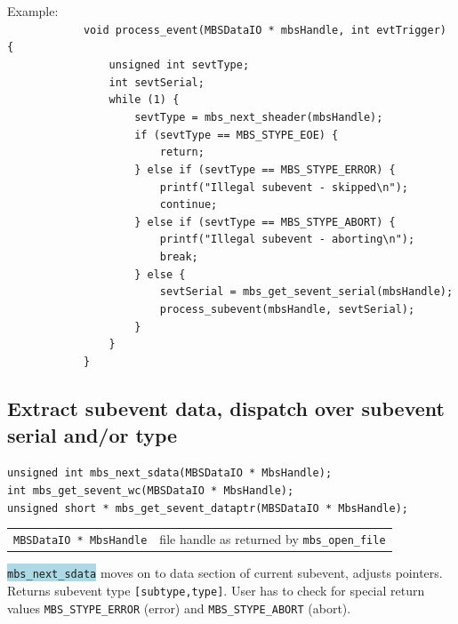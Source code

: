 \documentclass[10pt]{article}
\newcommand{\blue}[1]{\colorbox{lightblue}{\texttt{#1}}}
\newenvironment{yellowboxed}
	{\begin{Sbox}\begin{minipage}[t]}
	{\end{minipage}\end{Sbox}\colorbox{yellow}{\TheSbox}}
\newenvironment{blueboxed}
	{\begin{Sbox}\begin{minipage}[t]}
	{\end{minipage}\end{Sbox}\colorbox{lightblue}{\TheSbox}}
\begin{document}
\begin{yellowboxed}{\linewidth}
Example:\\
\verb+            void process_event(MBSDataIO * mbsHandle, int evtTrigger) {+\\
\verb+                unsigned int sevtType;+\\
\verb+                int sevtSerial;+\\
\verb+                while (1) {+\\
\verb+                    sevtType = mbs_next_sheader(mbsHandle);+\\
\verb+                    if (sevtType == MBS_STYPE_EOE) {+\\
\verb+                        return;+\\
\verb+                    } else if (sevtType == MBS_STYPE_ERROR) {+\\
\verb+                        printf("Illegal subevent - skipped\n");+\\
\verb+                        continue;+\\
\verb+                    } else if (sevtType == MBS_STYPE_ABORT) {+\\
\verb+                        printf("Illegal subevent - aborting\n");+\\
\verb+                        break;+\\
\verb+                    } else {+\\
\verb+                        sevtSerial = mbs_get_sevent_serial(mbsHandle);+\\
\verb+                        process_subevent(mbsHandle, sevtSerial);+\\
\verb+                    }+\\
\verb+                }+\\
\verb+            }+
\end{yellowboxed}
\newpage
\subsection{Extract subevent data, dispatch over subevent serial and/or type}\vspace{3mm}
\begin{center}
\begin{blueboxed}{.8\linewidth}
	\verb+unsigned int mbs_next_sdata(MBSDataIO * MbsHandle);+\\
	\verb+int mbs_get_sevent_wc(MBSDataIO * MbsHandle);+\\
	\verb+unsigned short * mbs_get_sevent_dataptr(MBSDataIO * MbsHandle);+
\end{blueboxed}
\end{center}
\begin{center}
\begin{tabular}{ll}
\verb+MBSDataIO * MbsHandle+	& file handle as returned by \verb+mbs_open_file+\\
\end{tabular}
\end{center}
\blue{mbs\_next\_sdata} moves on to data section of current subevent, adjusts pointers.
Returns subevent type \verb+[subtype,type]+.
User has to check for special return values 
\verb+MBS_STYPE_ERROR+ (error) and \verb+MBS_STYPE_ABORT+ (abort).
\end{document}
